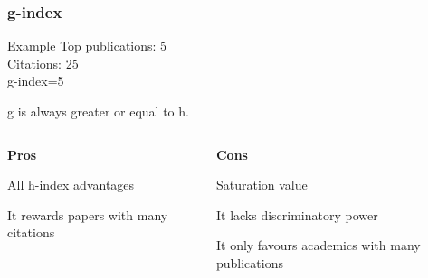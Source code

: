 \documentclass{beamer}
\begin{document}
\begin{frame}
    \frametitle{g-index}
    \begin{exampleblock}{Example}
        \centering Top publications: 5\\
        \centering Citations:        25\\
        \centering g-index=5
    \end{exampleblock}
    \begin{alertblock}{}
        g is always greater or equal to h.
    \end{alertblock}
    \begin{columns}[T]
        \begin{column}{.5\textwidth}
            \centering \textbf{Pros}
            \begin{propslist}
                \item All h-index advantages
                \item It rewards papers with many citations
            \end{propslist}
        \end{column}
        \begin{column}{.5\textwidth}
            \centering \textbf{Cons} %
            \begin{conslist}
                \item Saturation value
                \item It lacks discriminatory power
                \item It only favours academics with many publications
            \end{conslist}
        \end{column}
    \end{columns}
\end{frame}
\end{document}
